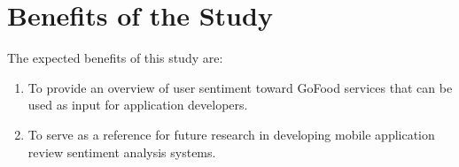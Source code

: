 \section{Benefits of the Study}

The expected benefits of this study are:

\begin{enumerate}
  \item To provide an overview of user sentiment toward GoFood services that can be used as input for application developers.
  \item To serve as a reference for future research in developing mobile application review sentiment analysis systems.
\end{enumerate}
